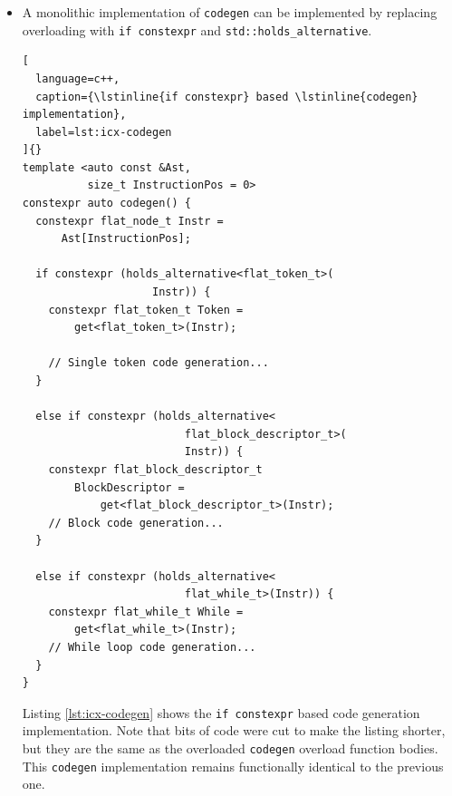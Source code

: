 \documentclass[../main]{subfiles}
\begin{document}
\begin{itemize}
\begin{lstlisting}[
  language=c++,
  caption={
    \lstinline{codegen} specialization
    for \lstinline{flat_while_t} elements
  },
  label=lst:ol-codegen-while
]{}
/// Code generation implementation
/// for a while block
template <auto const &Ast,
          size_t InstructionPos = 0>
constexpr auto codegen(flat_while_t) {
  return [](program_state_t &s) {
    while (s.data[s.i]) {
      codegen<Ast, get<flat_while_t>(
                       Ast[InstructionPos])
                       .block_begin>()(s);
    }
  };
}
\end{lstlisting}

The \lstinline{codegen} implementation for a while block
\ref{lst:ol-codegen-while} is trivial: it returns a function that runs a while
loop as defined by the Brainfuck language specification, and the body itself is
the code generation result for the block element it points to.

This implementation is a good way to show how code generation from a \gls{nttp}
can be implemented for a serialized \gls{ast}.

\item
A monolithic implementation of \lstinline{codegen} can be implemented by
replacing overloading with \lstinline{if constexpr} and
\lstinline{std::holds_alternative}.

\begin{lstlisting}[
  language=c++,
  caption={\lstinline{if constexpr} based \lstinline{codegen} implementation},
  label=lst:icx-codegen
]{}
template <auto const &Ast,
          size_t InstructionPos = 0>
constexpr auto codegen() {
  constexpr flat_node_t Instr =
      Ast[InstructionPos];

  if constexpr (holds_alternative<flat_token_t>(
                    Instr)) {
    constexpr flat_token_t Token =
        get<flat_token_t>(Instr);

    // Single token code generation...
  }

  else if constexpr (holds_alternative<
                         flat_block_descriptor_t>(
                         Instr)) {
    constexpr flat_block_descriptor_t
        BlockDescriptor =
            get<flat_block_descriptor_t>(Instr);
    // Block code generation...
  }

  else if constexpr (holds_alternative<
                         flat_while_t>(Instr)) {
    constexpr flat_while_t While =
        get<flat_while_t>(Instr);
    // While loop code generation...
  }
}
\end{lstlisting}

Listing \ref{lst:icx-codegen} shows the \lstinline{if constexpr} based
code generation implementation. Note that bits of code were cut to make
the listing shorter, but they are the same as the overloaded \lstinline{codegen}
overload function bodies. This \lstinline{codegen} implementation remains
functionally identical to the previous one.

\end{itemize}
\end{document}
